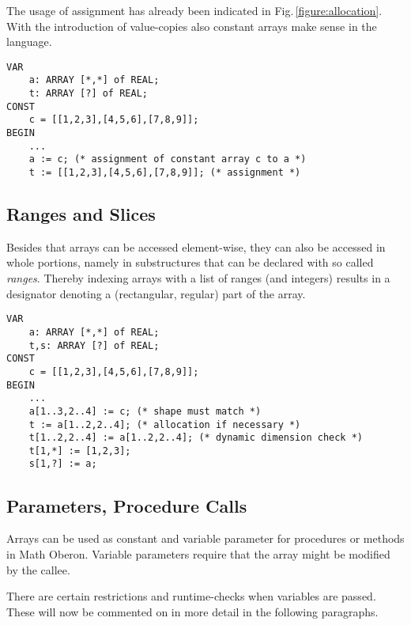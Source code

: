 \documentclass[a4wide,11pt]{article}
\begin{document}
The usage of assignment has already been indicated in Fig.\,\ref{figure:allocation}.
With the introduction of value-copies also constant arrays make sense in the language.

\begin{annotation}
\begin{lstlisting}[style=example, caption=Example of constant arrays and assignment,label=figure:constarrays]
VAR
    a: ARRAY [*,*] of REAL;
    t: ARRAY [?] of REAL;
CONST
    c = [[1,2,3],[4,5,6],[7,8,9]];
BEGIN
    ...
    a := c; (* assignment of constant array c to a *)
    t := [[1,2,3],[4,5,6],[7,8,9]]; (* assignment *)
\end{lstlisting}
\end{annotation}



\subsection{Ranges and Slices} Besides that arrays can be accessed element-wise, they can also be accessed in whole portions, namely in substructures that can be declared with so called \emph{ranges}.
Thereby indexing arrays with a list of ranges (and integers) results in a designator denoting a (rectangular, regular) part of the array.

\begin{annotation}
\begin{lstlisting}[style=example, caption=Example of ranges and their application,label=figure:ranges]
VAR
    a: ARRAY [*,*] of REAL;
    t,s: ARRAY [?] of REAL;
CONST
    c = [[1,2,3],[4,5,6],[7,8,9]];
BEGIN
    ...
    a[1..3,2..4] := c; (* shape must match *)
    t := a[1..2,2..4]; (* allocation if necessary *)
    t[1..2,2..4] := a[1..2,2..4]; (* dynamic dimension check *)
    t[1,*] := [1,2,3];
    s[1,?] := a;
\end{lstlisting}
\end{annotation}


\subsection{Parameters, Procedure Calls}\label{section:procedurecall}
Arrays can be used as constant and variable parameter for procedures or methods in Math Oberon.
Variable parameters require that the array might be modified by the callee.

There are certain restrictions and runtime-checks when variables are passed.
These will now be commented on in more detail in the following paragraphs.
\end{document}
